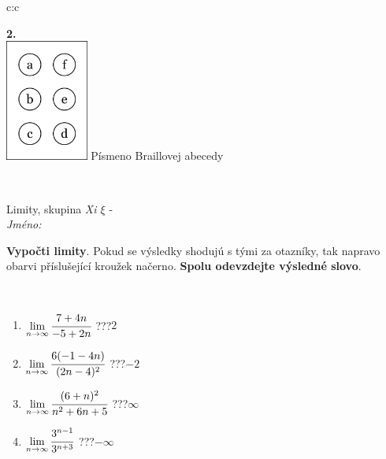 \documentclass[10pt]{report}
\begin{document}
\begin{tabular}{c:c}
\begin{minipage}[c][104.5mm][t]{0.5\linewidth}
\begin{center}
\begin{minipage}{0.20\linewidth}
\begin{center}
{\Huge\bfseries 2.} \\[2mm]
\includegraphics[height=40mm]{../images/braille.png}
{\small Písmeno Braillovej abecedy}
\end{center}
\end{minipage}
\end{center}
\end{minipage}
\\ \hdashline
\begin{minipage}[c][104.5mm][t]{0.5\linewidth}
\begin{center}
\vspace{7mm}
{\huge Limity, skupina \textit{Xi $\xi$} -}\\[5mm]
\textit{Jméno:}\phantom{xxxxxxxxxxxxxxxxxxxxxxxxxxxxxxxxxxxxxxxxxxxxxxxxxxxxxxxxxxxxxxxxx}\\[5mm]
\begin{minipage}{0.95\linewidth}
\begin{center}
\textbf{Vypočti limity}. Pokud se výsledky shodujú s tými za otazníky, tak napravo\\obarvi příslušející kroužek načerno. \textbf{Spolu odevzdejte výsledné slovo}.
\end{center}
\end{minipage}
\\[1mm]
\begin{minipage}{0.79\linewidth}
\begin{center}
\begin{varwidth}{\linewidth}
\begin{enumerate}
\normalsize
\item $\lim\limits_{n\to\infty}\cfrac{7+4n}{-5+2n}$\quad \dotfill\; ???\;\dotfill \quad $2$
\item $\lim\limits_{n\to\infty}\cfrac{6(-1-4n)}{(2n-4)^2}$\quad \dotfill\; ???\;\dotfill \quad $-2$
\item $\lim\limits_{n\to\infty}\cfrac{(6+n)^2}{n^2+6n+5}$\quad \dotfill\; ???\;\dotfill \quad $\infty$
\item $\lim\limits_{n\to\infty}\cfrac{3^{n-1}}{3^{n+3}}$\quad \dotfill\; ???\;\dotfill \quad $-\infty$

\end{enumerate}
\end{varwidth}
\end{center}
\end{minipage}
\end{center}
\end{minipage}
\end{tabular}
\end{document}
